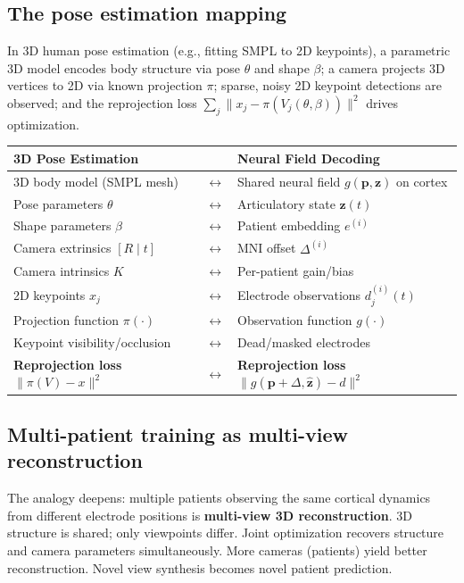 \documentclass[11pt,letterpaper]{article}
\newcommand{\bfp}{\mathbf{p}}
\newcommand{\bfz}{\mathbf{z}}
\begin{document}
\subsection{The pose estimation mapping}

In 3D human pose estimation (e.g., fitting SMPL to 2D keypoints), a parametric 3D model encodes body structure via pose $\theta$ and shape $\beta$; a camera projects 3D vertices to 2D via known projection $\pi$; sparse, noisy 2D keypoint detections are observed; and the reprojection loss $\sum_j \|x_j - \pi(V_j(\theta, \beta))\|^2$ drives optimization.

\begin{table}[h]\centering\small
\begin{tabular}{@{}p{}p{}p{}@{}}
\toprule
\textbf{3D Pose Estimation} & & \textbf{Neural Field Decoding} \\
\midrule
3D body model (SMPL mesh) & $\leftrightarrow$ & Shared neural field $g(\bfp, \bfz)$ on cortex \\[3pt]
Pose parameters $\theta$ & $\leftrightarrow$ & Articulatory state $\bfz(t)$ \\[3pt]
Shape parameters $\beta$ & $\leftrightarrow$ & Patient embedding $e^{(i)}$ \\[3pt]
Camera extrinsics $[R \mid t]$ & $\leftrightarrow$ & MNI offset $\Delta^{(i)}$ \\[3pt]
Camera intrinsics $K$ & $\leftrightarrow$ & Per-patient gain/bias \\[3pt]
2D keypoints $x_j$ & $\leftrightarrow$ & Electrode observations $d_j^{(i)}(t)$ \\[3pt]
Projection function $\pi(\cdot)$ & $\leftrightarrow$ & Observation function $g(\cdot)$ \\[3pt]
Keypoint visibility/occlusion & $\leftrightarrow$ & Dead/masked electrodes \\[3pt]
\textbf{Reprojection loss} $\|\pi(V) - x\|^2$ & $\leftrightarrow$ & \textbf{Reprojection loss} $\|g(\bfp{+}\Delta, \hat{\bfz}) - d\|^2$ \\
\bottomrule
\end{tabular}
\end{table}

\subsection{Multi-patient training as multi-view reconstruction}

The analogy deepens: multiple patients observing the same cortical dynamics from different electrode positions is \textbf{multi-view 3D reconstruction}. 3D structure is shared; only viewpoints differ. Joint optimization recovers structure and camera parameters simultaneously. More cameras (patients) yield better reconstruction. Novel view synthesis becomes novel patient prediction.
\end{document}
